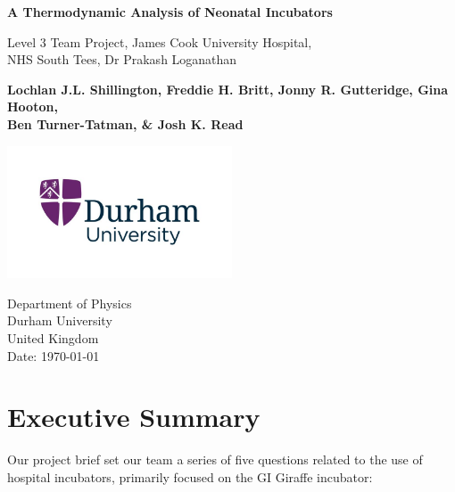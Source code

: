 \documentclass{article}
\date{\vspace{-5ex}}
\begin{document}
\vspace{-10mm}



\begin{titlepage}
   \begin{center}
       \vspace*{1cm}

       \textbf{\large A Thermodynamic Analysis of Neonatal Incubators}

       \vspace{0.5cm}
        Level 3 Team Project, James Cook University Hospital, \\ NHS South Tees, Dr Prakash Loganathan
            
       \vspace{1.5cm}

       \textbf{Lochlan J.L. Shillington, Freddie H. Britt, Jonny R. Gutteridge, Gina Hooton, \\ Ben Turner-Tatman, \& Josh K. Read}

       \vspace{5cm}

       \includegraphics[width=0.5\textwidth]{Durham.jpeg}
            
       Department of Physics\\
       Durham University\\
       United Kingdom\\
       Date: \today{}
        
        
   \end{center}
   
   
\end{titlepage}


\tableofcontents

\newpage

\section{Executive Summary}
Our project brief set our team a series of five questions related to the use of hospital incubators, primarily focused on the GI Giraffe incubator: 
\end{document}
